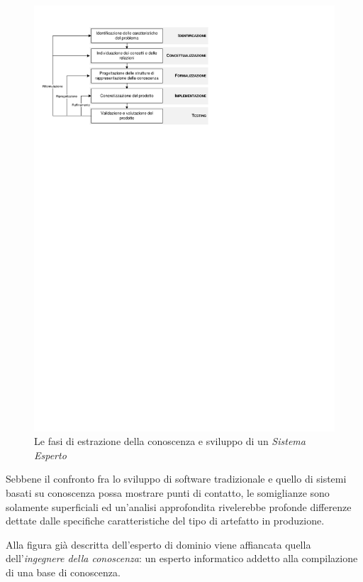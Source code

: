 \begin{figure}[h]
\centering
\includegraphics[viewport=16 607 346 801]{Immagini/Capitolo1/Fasi-acquisizione.pdf}
\caption{Le fasi di estrazione della conoscenza e sviluppo di un \emph{Sistema Esperto}}\label{fig:fasi-progettazione}
\end{figure}


Sebbene il confronto fra lo sviluppo di software tradizionale e quello di sistemi basati su conoscenza possa mostrare punti di contatto, le somiglianze sono solamente superficiali ed un'analisi approfondita rivelerebbe profonde differenze dettate dalle specifiche caratteristiche del tipo di artefatto in produzione.~\cite{esposito2012icse}

Alla figura già descritta dell'esperto di dominio viene affiancata quella dell'\emph{ingegnere della conoscenza}: un esperto informatico addetto alla compilazione di una base di conoscenza.

